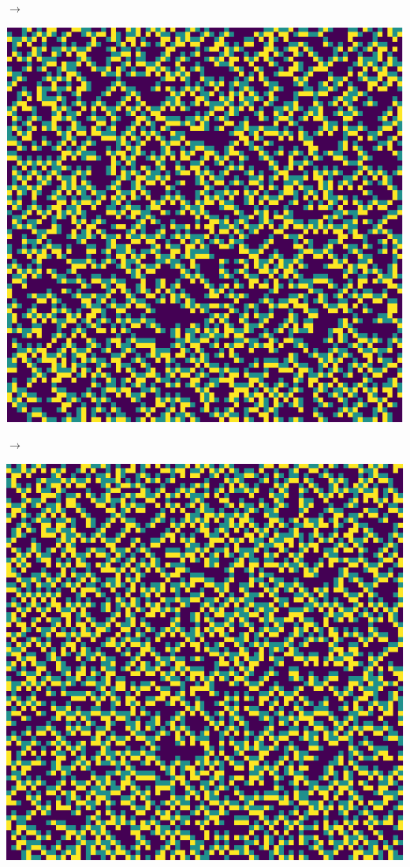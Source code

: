 \documentclass[12pt, a4paper]{article}
\begin{document}
\begin{center}
\begin{minipage}{.17\linewidth}
            \end{minipage}
            $\rightarrow$
            \begin{minipage}{.17\linewidth}
                \includegraphics[scale=0.15]{img/part1/step4.png}
            \end{minipage}
            $\rightarrow$
            \begin{minipage}{.17\linewidth}
                \includegraphics[scale=0.15]{img/part1/step5.png}
            \end{minipage}
        \end{center}
    
\end{document}
